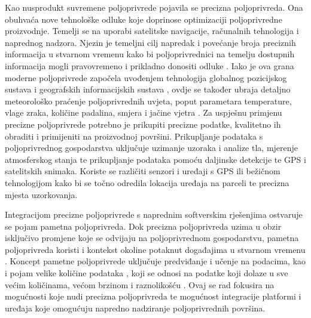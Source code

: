 Kao nusprodukt suvremene poljoprivrede pojavila se precizna poljoprivreda. Ona obuhvaća nove tehnološke odluke koje doprinose optimizaciji poljoprivredne proizvodnje. Temelji se na uporabi satelitske navigacije, računalnih tehnologija i naprednog nadzora. Njezin je temeljni cilj napredak i povećanje broja preciznih informacija u stvarnom vremenu kako bi poljoprivrednici na temelju dostupnih informacija mogli pravovremeno i prikladno donositi odluke \cite{arapovic}. Iako je ova grana moderne poljoprivrede započela uvođenjem tehnologija globalnog pozicijskog sustava  i geografskih informacijskih sustava , ovdje se također ubraja detaljno meteorološko praćenje poljoprivrednih uvjeta, poput parametara temperature, vlage zraka, količine padalina, smjera i jačine vjetra \cite{digitalagro}. Za uspješnu primjenu precizne poljoprivrede potrebno je prikupiti precizne podatke, kvalitetno ih obraditi i primijeniti na proizvodnoj površini. Prikupljanje podataka s poljoprivrednog gospodarstva uključuje uzimanje uzoraka i analize tla, mjerenje atmosferskog stanja te prikupljanje podataka pomoću daljinske detekcije te GPS i satelitskih snimaka. Koriste se različiti senzori i uređaji s GPS ili bežičnom tehnologijom kako bi se točno odredila lokacija uređaja na parceli te precizna mjesta uzorkovanja. 

Integracijom precizne poljoprivrede s naprednim softverskim rješenjima ostvaruje se pojam pametna poljoprivreda. Dok precizna poljoprivreda uzima u obzir isključivo promjene koje se odvijaju na poljoprivrednom gospodarstvu, pametna poljoprivreda koristi i kontekst okoline potaknut događajima u stvarnom vremenu \cite{arapovic}. Koncept pametne poljoprivrede uključuje predviđanje i učenje na podacima, kao i pojam velike količine podataka , koji se odnosi na podatke koji dolaze u sve većim količinama, većom brzinom i raznolikošću \cite{big_data}. Ovaj se rad fokusira na mogućnosti koje nudi precizna poljoprivreda te mogućnost integracije platformi i uređaja koje omogućuju napredno nadziranje poljoprivrednih površina. 

